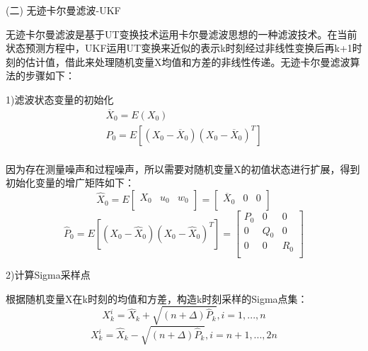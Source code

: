 (二)	无迹卡尔曼滤波-UKF

	无迹卡尔曼滤波是基于UT变换技术运用卡尔曼滤波思想的一种滤波技术。在当前状态预测方程中，UKF运用UT变换来近似的表示k时刻经过非线性变换后再k+1时刻的估计值，借此来处理随机变量X均值和方差的非线性传递。无迹卡尔曼滤波算法的步骤如下：

1)滤波状态变量的初始化
\begin{equation}
\begin{array}{l}
   {{\overline{X}}_{0}}=E\left( {{X}_{0}} \right) \\ 
  {{P}_{0}}=E\left[ \left( {{X}_{0}}-{{\overline{X}}_{0}} \right){{\left( {{X}_{0}}-{{\overline{X}}_{0}} \right)}^{T}} \right] \\ 
\end{array}
\end{equation}

因为存在测量噪声和过程噪声，所以需要对随机变量X的初值状态进行扩展，得到初始化变量的增广矩阵如下：
\begin{equation}
{{\widehat{X}}_{0}}=E\left[ \begin{matrix}
   {{X}_{0}} & {{u}_{0}} & {{w}_{0}}  \\
\end{matrix} \right]=\left[ \begin{matrix}
   {{\overline{X}}_{0}} & 0 & 0  \\
\end{matrix} \right]
\end{equation}
\begin{equation}
{{\widehat{P}}_{0}}=E\left[ \left( {{X}_{0}}-{{\widehat{X}}_{0}} \right){{\left( {{X}_{0}}-{{\widehat{X}}_{0}} \right)}^{T}} \right]=\left[ \begin{matrix}
   {{P}_{0}} & 0 & 0  \\
   0 & {{Q}_{0}} & 0  \\
   0 & 0 & {{R}_{0}}  \\
\end{matrix} \right]
\end{equation}

2)计算Sigma采样点

根据随机变量X在k时刻的均值和方差，构造k时刻采样的Sigma点集：
\begin{equation}
X_{k}^{i}={{\widehat{X}}_{k}}+\sqrt{(n+\Delta ){{\widehat{P}}_{k}}},i=1,...,n
\end{equation}    
\begin{equation}
X_{k}^{i}={{\widehat{X}}_{k}}-\sqrt{(n+\Delta ){{\widehat{P}}_{k}}},i=n+1,...,2n
\end{equation} 

